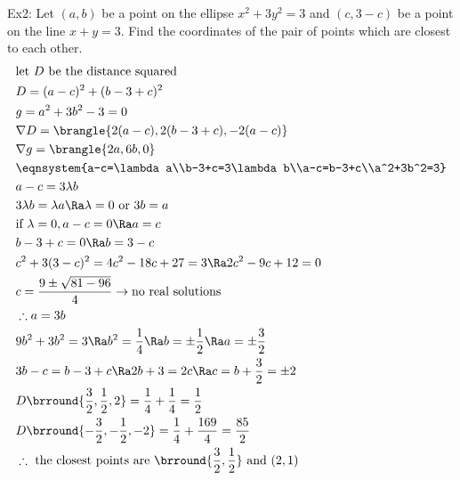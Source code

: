 Ex2: Let $(a,b)$ be a point on the ellipse $x^2+3y^2=3$ and $(c,3-c)$ be a point on the line $x+y=3$. Find the coordinates of the pair of points which are closest to each other.
\begin{align*}
    &\text{let $D$ be the distance squared}\\
    &D=(a-c)^2+(b-3+c)^2\\
    &g=a^2+3b^2-3=0\\
    &\nabla D=\brangle{2(a-c),2(b-3+c),-2(a-c)}\\
    &\nabla g=\brangle{2a,6b,0}\\
    &\eqnsystem{a-c=\lambda a\\b-3+c=3\lambda b\\a-c=b-3+c\\a^2+3b^2=3}\\
    &a-c=3\lambda b\\
    &3\lambda b=\lambda a\Ra \lambda=0\text{ or }3b=a\\
    &\text{if }\lambda=0, a-c=0\Ra a=c\\
    &b-3+c=0\Ra b=3-c\\
    &c^2+3(3-c)^2=4c^2-18c+27=3\Ra 2c^2-9c+12=0\\
    &c=\frac{9\pm\sqrt{81-96}}{4}\to\text{no real solutions}\\
    &\therefore a=3b\\
    &9b^2+3b^2=3\Ra b^2=\frac{1}{4}\Ra b=\pm\frac{1}{2}\Ra a=\pm\frac{3}{2}\\
    &3b-c=b-3+c\Ra 2b+3=2c\Ra c=b+\frac{3}{2}=\pm2\\
    &D\brround{\frac{3}{2},\frac{1}{2},2}=\frac{1}{4}+\frac{1}{4}=\frac{1}{2}\\
    &D\brround{-\frac{3}{2},-\frac{1}{2},-2}=\frac{1}{4}+\frac{169}{4}=\frac{85}{2}\\
    &\therefore \text{ the closest points are }\brround{\frac{3}{2},\frac{1}{2}}\text{ and }(2,1)
\end{align*}
